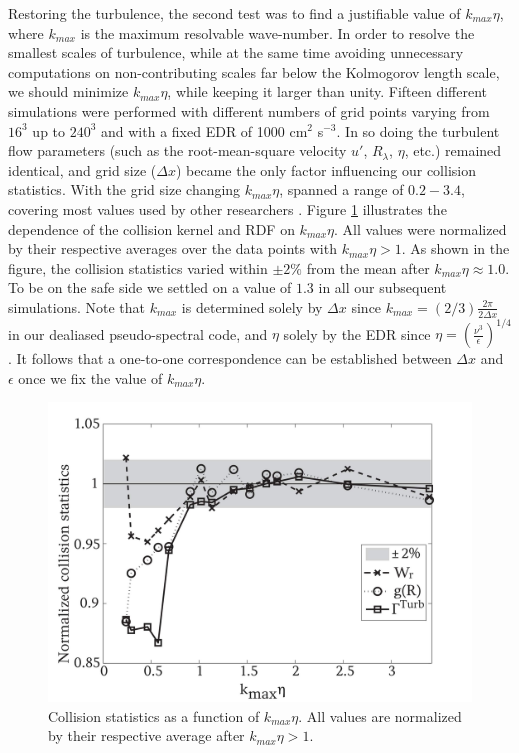 Restoring the turbulence, the second test was to find a justifiable value of $k_{max}\eta$, where $k_{max}$ is the maximum resolvable wave-number. In order to resolve the smallest scales of turbulence, while at the same time avoiding unnecessary computations on non-contributing scales far below the Kolmogorov length scale, we should minimize $k_{max}\eta$, while keeping it larger than unity. Fifteen different simulations were performed with different numbers of grid points varying from $16^3$ up to $240^3$ and with a fixed EDR of 1000 cm$^2$ s$^{-3}$. In so doing the turbulent flow parameters (such as the root-mean-square velocity $u\prime$, $R_\lambda$, $\eta$, etc.) remained identical, and grid size ($\Delta x$) became the only factor influencing our collision statistics. With the grid size changing $k_{max}\eta$, spanned a range of $0.2-3.4$, covering most values used by other researchers \citep{Ayala2008a, Franklin2005, Wang1993, Yeung1989}. Figure \ref{fig:kmaxeta1} illustrates the dependence of the collision kernel and RDF on $k_{max}\eta$. All values were normalized by their respective averages over the data points with $k_{max}\eta>1$. As shown in the figure, the collision statistics varied within $\pm 2\%$ from the mean after $k_{max}\eta \approx 1.0$. To be on the safe side we settled on a value of $1.3$ in all our subsequent simulations. Note that $k_{max}$ is determined solely by $\Delta x$ since $k_{max}=(2/3)\frac{2\pi}{2 \Delta x}$ in our dealiased pseudo-spectral code, and $\eta$ solely by the EDR since $\eta = (\frac{\nu^3}{\epsilon})^{1/4}$. It follows that a one-to-one correspondence can be established between $\Delta x$ and $\epsilon$ once we fix the value of $k_{max}\eta$. 

\begin{figure}[ht]
\centering
\includegraphics[width=\textwidth]{Figures/Chap2/kmaxeta.jpg} 
\caption{Collision statistics as a function of $k_{max}\eta$. All values are normalized by their respective average after $k_{max}\eta>1$. }\label{fig:kmaxeta1}
\end{figure}


